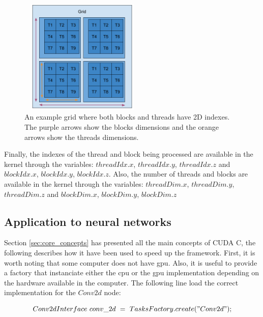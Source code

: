 \documentclass[11pt]{report}
\begin{document}
\begin{figure}[h]
\centering
\includegraphics[width=6cm, height=5.5cm]{grid}
\caption{An example grid where both blocks and threads have 2D indexes. The purple arrows show the blocks dimensions and the orange arrows show the threads dimensions.}
\label{fig:grid}
\end{figure}

\noindent Finally, the indexes of the thread and block being processed are available in the kernel through the variables: $threadIdx.x$, $threadIdx.y$, $threadIdx.z$ and  $blockIdx.x$, $blockIdx.y$, $blockIdx.z$. Also, the number of threads and blocks are available in the kernel through the variables: $threadDim.x$, $threadDim.y$, $threadDim.z$ and  $blockDim.x$, $blockDim.y$, $blockDim.z$

\subsection{Application to neural networks}

Section \ref{sec:core_concepts} has presented all the main concepts of CUDA C, the following describes how it have been used to speed up the framework. First, it is worth noting that some computer does not have \acrshort{gpu}. Also, it is useful to provide a factory that instanciate either the \acrshort{cpu} or the \acrshort{gpu} implementation depending on the hardware available in the computer. The following line load the correct implementation for the $Conv2d$ node:

$$Conv2dInterface\ conv\_2d\ =\ TasksFactory.create("Conv2d");$$
\end{document}
